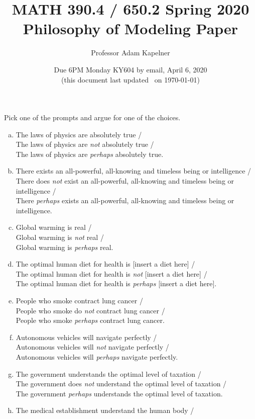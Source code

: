 \documentclass[12pt]{article}
\title{MATH 390.4 / 650.2 Spring 2020 \\ Philosophy of Modeling Paper}
\author{Professor Adam Kapelner} %
\date{Due 6PM Monday KY604 by email, April 6, 2020 \\ \vspace{0.5cm} \small (this document last updated \currenttime~on \today)}
\begin{document}
\maketitle

\noindent Pick one of the prompts and argue for one of the choices. 

\begin{enumerate}[(a)]
\item The laws of physics are absolutely true / \\
The laws of physics are \textit{not} absolutely true / \\
The laws of physics are \textit{perhaps} absolutely true.
\item There exists an all-powerful, all-knowing and timeless being or intelligence / \\
There does \textit{not} exist an all-powerful, all-knowing and timeless being or intelligence / \\
There \textit{perhaps} exists an all-powerful, all-knowing and timeless being or intelligence.
\item Global warming is real / \\
Global warming is \textit{not} real / \\
Global warming is \textit{perhaps} real.
\item The optimal human diet for health is [insert a diet here] / \\
The optimal human diet for health is \textit{not} [insert a diet here] / \\
The optimal human diet for health is \textit{perhaps} [insert a diet here].
\item People who smoke contract lung cancer / \\
People who smoke do \textit{not} contract lung cancer / \\
People who smoke \textit{perhaps} contract lung cancer.
\item Autonomous vehicles will navigate perfectly / \\
Autonomous vehicles will \textit{not} navigate perfectly / \\
Autonomous vehicles will \textit{perhaps} navigate perfectly.
\item The government understands the optimal level of taxation / \\
The government does \textit{not} understand the optimal level of taxation / \\
The government \textit{perhaps} understands the optimal level of taxation.
\item The medical establishment understand the human body / \\

\end{enumerate}
\end{document}
